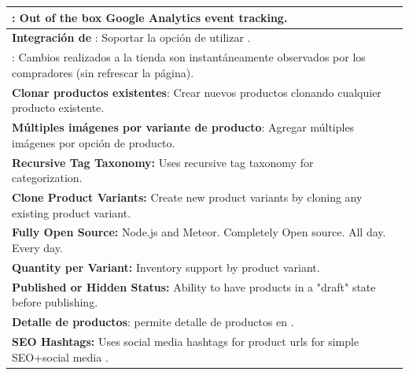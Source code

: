 \begin{table}[h!]
\begin{tabular}{ |L{0.6\paperwidth}|L{0.1\paperwidth}|}
\\ \hline
	\textbf{ \googleanalytics}: Out of the box Google Analytics event tracking.&
		
\\ \hline
	\textbf{ Integración de \paypal}: Soportar la opción de utilizar \paypal \checkout.&
		
\\ \hline
	\textbf{\realtime \itemupdates}: Cambios realizados a la tienda son instantáneamente observados por los compradores (sin refrescar la página).&
		
\\ \hline
	\textbf{Clonar productos existentes}: Crear nuevos productos clonando cualquier producto existente.&
		
\\ \hline
	\textbf{Múltiples imágenes por variante de producto}: Agregar múltiples imágenes por opción de producto.&
		
\\ \hline
	\textbf{ Recursive Tag Taxonomy:} Uses recursive tag taxonomy for categorization.&
		
\\ \hline
	 \textbf{ Clone Product Variants:} Create new product variants by cloning any existing product variant.&
	
\\ \hline
	\textbf{ Fully Open Source:} Node.js and Meteor. Completely Open source. All day. Every day.&
	
\\ \hline
	\textbf{ Quantity per Variant:} Inventory support by product variant.&
	
\\ \hline
	\textbf{ Published or Hidden Status:} Ability to have products in a "draft" state before publishing.&
	
\\ \hline
	\textbf{ Detalle de productos}: permite detalle de productos en \keyvalue \listhighlevel .&
	
\\ \hline
	\textbf{ SEO Hashtags:} Uses social media hashtags for product urls for simple SEO+social media \tracking.&
	

\end{tabular}
\end{table}
